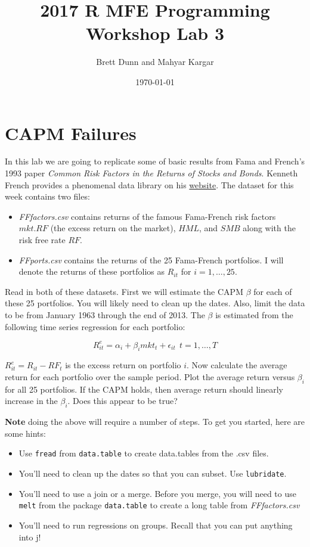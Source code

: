 \documentclass[11pt]{article}
\author{Brett Dunn and Mahyar Kargar}
\date{\today}
\title{2017 R MFE Programming Workshop Lab 3}
\begin{document}


\maketitle
\onehalfspacing
\section{CAPM Failures}
\label{sec-1}
In this lab we are going to replicate some of basic results from Fama
and French's 1993 paper \emph{Common Risk Factors in the Returns of Stocks
and Bonds}. Kenneth French provides a phenomenal data library on his
\href{http://mba.tuck.dartmouth.edu/pages/faculty/ken.french/data_library.html}{website}. The dataset for this week contains two files:

\begin{itemize}
\item \emph{FFfactors.csv} contains returns of the famous Fama-French risk
factors $mkt.RF$ (the excess return on the market), $HML$, and $SMB$
along with the risk free rate $RF$.
\item \emph{FFports.csv} contains the returns of the 25 Fama-French
portfolios. I will denote the returns of these portfolios as
$R_{it}$ for $i=1,\ldots,25$.
\end{itemize}

Read in both of these datasets. First we will estimate the CAPM
$\beta$ for each of these 25 portfolios. You will likely need to clean
up the dates. Also, limit the data to be from January 1963 through the
end of 2013. The $\beta$ is estimated from the following time series
regression for each portfolio:

\begin{equation*}
R^{e}_{it} = \alpha_{i} + \beta_{i} mkt_{t} + \epsilon_{it} \ \ t=1,\ldots,T
\end{equation*}

$R^{e}_{it} = R_{it} - RF_{t}$ is the excess return on portfolio
$i$. Now calculate the average return for each portfolio over the
sample period. Plot the average return versus $\beta_{i}$ for all 25
portfolios. If the CAPM holds, then average return should linearly
increase in the $\beta_{i}$. Does this appear to be true?

\textbf{Note} doing the above will require a number of steps. To get you
 started, here are some hints:

\begin{itemize}
\item Use \verb~fread~ from \verb~data.table~ to create data.tables from the .csv files. 
\item You'll need to clean up the dates so that you can subset. Use
\verb~lubridate~.
\item You'll need to use a join or a merge. Before you merge, you will need to use \verb~melt~ from the package \verb~data.table~ to create a long table from \emph{FFfactors.csv} 
\item You'll need to run regressions on groups. Recall that you can put anything into j!
\end{itemize}
\end{document}
